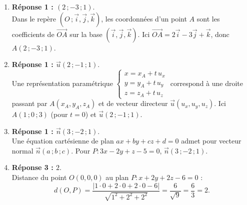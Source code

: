 \documentclass[11pt]{article}
\begin{document}
\begin{corrige}
\begin{enumerate}
\item \textbf{Réponse 1 : $(2\,;-3\,;1)$}.\\
Dans le repère $(O\,;\vec{i},\vec{j},\vec{k})$, les coordonnées d'un point $A$ sont les coefficients de $\overrightarrow{OA}$ sur la base $(\vec{i},\vec{j},\vec{k})$. Ici $\overrightarrow{OA} = 2\vec{i} - 3\vec{j} + \vec{k}$, donc $A(2\,;-3\,;1)$.

\item \textbf{Réponse 1 : $\vec{u}(2\,;-1\,;1)$}.\\
Une représentation paramétrique $\begin{cases} x = x_A + t\,u_x \\ y = y_A + t\,u_y \\ z = z_A + t\,u_z \end{cases}$ correspond à une droite passant par $A(x_A,y_A,z_A)$ et de vecteur directeur $\vec{u}(u_x,u_y,u_z)$. Ici $A(1\,;0\,;3)$ (pour $t=0$) et $\vec{u}(2\,;-1\,;1)$.

\item \textbf{Réponse 1 : $\vec{n}(3\,;-2\,;1)$}.\\
Une équation cartésienne de plan $ax+by+cz+d=0$ admet pour vecteur normal $\vec{n}(a\,;b\,;c)$. Pour $P : 3x - 2y + z - 5 = 0$, $\vec{n}(3\,;-2\,;1)$.

\item \textbf{Réponse 3 : $2$}.\\
Distance du point $O(0,0,0)$ au plan $P : x+2y+2z-6=0$ :
\[
d(O,P) = \frac{|1\cdot0 + 2\cdot0 + 2\cdot0 - 6|}{\sqrt{1^2+2^2+2^2}} = \frac{6}{\sqrt{9}} = \frac{6}{3} = 2.
\]
\end{enumerate}
\end{corrige}
\end{document}
